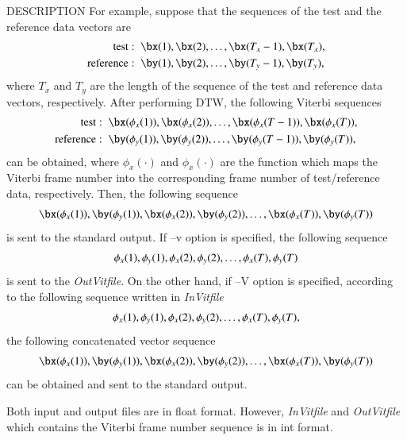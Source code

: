 \begin{qsection}{DESCRIPTION}
 For example, suppose that the sequences of the test and the reference data vectors are
 \begin{align}
  \mathrm{test} :\;\; & \bx(1), \bx(2), \dots, \bx(T_x - 1), \bx(T_x), \notag \\
  \mathrm{reference}  :\;\; & \by(1), \by(2), \dots, \by(T_y - 1), \by(T_y), \notag
 \end{align}
 where $T_x$ and $T_y$ are the length of the sequence of the test and reference data
 vectors, respectively. After performing DTW, the following Viterbi sequences
 \begin{align}
  \mathrm{test} :\;\; & \bx(\phi_x(1)), \bx(\phi_x(2)), \dots, \bx(\phi_x(T - 1)),
  \bx(\phi_{x}(T)), \notag \\
  \mathrm{reference}  :\;\; & \by(\phi_y(1)), \by(\phi_y(2)), \dots,
  \by(\phi_y(T - 1)), \by(\phi_y(T)), \notag
 \end{align}
 can be obtained, where $\phi_x(\cdot)$ and $\phi_x(\cdot)$ are the function which
 maps the Viterbi frame number into the corresponding frame number of test/reference
 data, respectively.  Then, the following sequence
 \begin{align}
  \bx(\phi_x(1)), \by(\phi_y(1)),
  \bx(\phi_x(2)), \by(\phi_y(2)),
  \dots, \bx(\phi_{x}(T)), \by(\phi_y(T)) \notag
 \end{align}
 is sent to the standard output.
 If --v option is specified, the following sequence
 \begin{align}
  \phi_x(1), \phi_y(1),
  \phi_x(2), \phi_y(2),
  \dots, \phi_{x}(T), \phi_y(T) \notag
 \end{align}
 is sent to the {\em OutVitfile}.
 On the other hand, if --V option is specified, according to the following sequence
 written in {\em InVitfile}
 \begin{align}
  \phi_x(1), \phi_y(1),
  \phi_x(2), \phi_y(2),
  \dots, \phi_{x}(T), \phi_y(T), \notag
 \end{align}
 the following concatenated vector sequence
 \begin{align}
  \bx(\phi_x(1)), \by(\phi_y(1)),
  \bx(\phi_x(2)), \by(\phi_y(2)),
  \dots, \bx(\phi_{x}(T)), \by(\phi_y(T)) \notag
 \end{align}
 can be obtained and sent to the standard output.

 Both input and output files are in float format. However,
 {\em InVitfile} and {\em OutVitfile} which contains the Viterbi frame number
 sequence is in int format.
\end{qsection}
